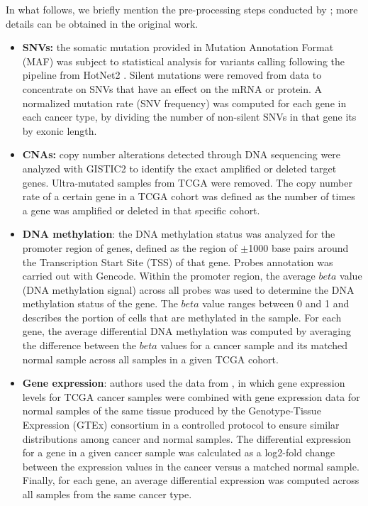 In what follows, we briefly mention the pre-processing steps conducted by \citet{schulte2021integration}; more details can be obtained in the original work.
 

\begin{itemize}
    \item \textbf{SNVs:} the somatic mutation provided in Mutation Annotation Format (MAF) was subject to statistical analysis for variants calling following the pipeline from HotNet2 \cite{leiserson2015pan}. Silent mutations were removed from data to concentrate on SNVs that have an effect on the mRNA or protein. A normalized mutation rate (\ie SNV frequency) was computed for each gene in each cancer type, by dividing the number of non-silent SNVs in that gene its by exonic length. 
    \item \textbf{CNAs:} copy number alterations detected through DNA sequencing were analyzed with GISTIC2 \cite{gistic2} to identify the exact amplified or deleted target genes. Ultra-mutated samples from TCGA were removed. The copy number rate of a certain gene in a TCGA cohort was defined as the number of times a gene was amplified or deleted in that specific cohort.
    \item \textbf{DNA methylation}: the DNA methylation status was analyzed for the promoter region of genes, defined as the region of $\pm$1000 base pairs around the Transcription Start Site (TSS) of that gene. Probes annotation was carried out with Gencode. Within the promoter region, the average $beta$ value (\ie DNA methylation signal) across all probes was used to determine the DNA methylation status of the gene. The $beta$ value ranges between 0 and 1 and describes the portion of cells that are methylated in the sample. For each gene, the average differential DNA methylation was computed by averaging the difference between the $beta$ values for a cancer sample and its matched normal sample across all samples in a given TCGA cohort.
    \item \textbf{Gene expression}: authors used the data from \citet{wang2018unifying}, in which gene expression levels for TCGA cancer samples were combined with gene expression data for normal samples of the same tissue produced by the  Genotype-Tissue Expression (GTEx) consortium in a controlled protocol to ensure similar distributions among cancer and normal samples. The differential expression for a gene in a given cancer sample was calculated as a log2-fold change between the expression values in the cancer versus a matched normal sample. Finally, for each gene, an average differential expression was computed across all samples from the same cancer type.
\end{itemize}



